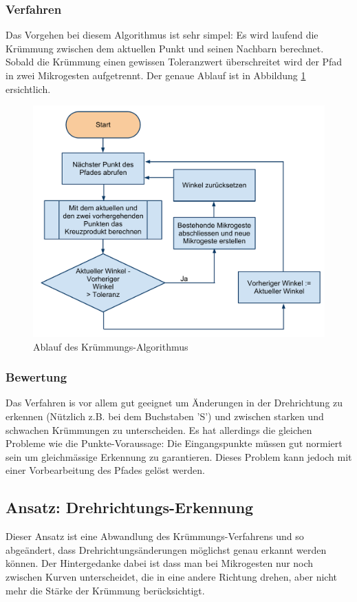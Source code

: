 \subsubsection{Verfahren}
Das Vorgehen bei diesem Algorithmus ist sehr simpel: Es wird laufend die Krümmung zwischen dem aktuellen Punkt und seinen Nachbarn berechnet. Sobald die Krümmung einen gewissen Toleranzwert überschreitet wird der Pfad in zwei Mikrogesten aufgetrennt. Der genaue Ablauf ist in Abbildung \ref{curvatureflowchart} ersichtlich.

\begin{figure}[h!]
  \centering
    \includegraphics[width=\textwidth]{./img/CurvatureFlowchart.pdf}
  \caption{Ablauf des Krümmungs-Algorithmus}
  \label{curvatureflowchart}
\end{figure}

\subsubsection{Bewertung}
Das Verfahren is vor allem gut geeignet um Änderungen in der Drehrichtung zu erkennen (Nützlich z.B. bei dem Buchstaben 'S') und zwischen starken und schwachen Krümmungen zu unterscheiden. Es hat allerdings die gleichen Probleme wie die Punkte-Voraussage: Die Eingangspunkte müssen gut normiert sein um gleichmässige Erkennung zu garantieren. Dieses Problem kann jedoch mit einer Vorbearbeitung des Pfades gelöst werden.


\subsection{Ansatz: Drehrichtungs-Erkennung}
Dieser Ansatz ist eine Abwandlung des Krümmungs-Verfahrens und so abgeändert, dass Drehrichtungsänderungen möglichst genau erkannt werden können. Der Hintergedanke dabei ist dass man bei Mikrogesten nur noch zwischen Kurven unterscheidet, die in eine andere Richtung drehen, aber nicht mehr die Stärke der Krümmung berücksichtigt.

